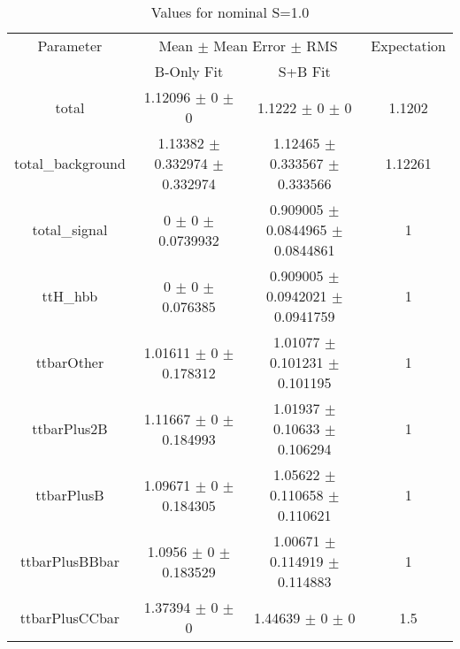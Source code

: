 \begin{table}
\centering
\caption{Values for nominal S=1.0}
\begin{tabular}{cccc}
\toprule
Parameter & \multicolumn{2}{c}{Mean $\pm$ Mean Error $\pm$ RMS} & Expectation\\
 & B-Only Fit & S+B Fit & \\
\midrule
total & \num{1.12096} $\pm$ \num{0} $\pm$ \num{0} & \num{1.1222} $\pm$ \num{0} $\pm$ \num{0} & \num{1.1202}\\
total\_background & \num{1.13382} $\pm$ \num{0.332974} $\pm$ \num{0.332974} & \num{1.12465} $\pm$ \num{0.333567} $\pm$ \num{0.333566} & \num{1.12261}\\
total\_signal & \num{0} $\pm$ \num{0} $\pm$ \num{0.0739932} & \num{0.909005} $\pm$ \num{0.0844965} $\pm$ \num{0.0844861} & \num{1}\\
ttH\_hbb & \num{0} $\pm$ \num{0} $\pm$ \num{0.076385} & \num{0.909005} $\pm$ \num{0.0942021} $\pm$ \num{0.0941759} & \num{1}\\
ttbarOther & \num{1.01611} $\pm$ \num{0} $\pm$ \num{0.178312} & \num{1.01077} $\pm$ \num{0.101231} $\pm$ \num{0.101195} & \num{1}\\
ttbarPlus2B & \num{1.11667} $\pm$ \num{0} $\pm$ \num{0.184993} & \num{1.01937} $\pm$ \num{0.10633} $\pm$ \num{0.106294} & \num{1}\\
ttbarPlusB & \num{1.09671} $\pm$ \num{0} $\pm$ \num{0.184305} & \num{1.05622} $\pm$ \num{0.110658} $\pm$ \num{0.110621} & \num{1}\\
ttbarPlusBBbar & \num{1.0956} $\pm$ \num{0} $\pm$ \num{0.183529} & \num{1.00671} $\pm$ \num{0.114919} $\pm$ \num{0.114883} & \num{1}\\
ttbarPlusCCbar & \num{1.37394} $\pm$ \num{0} $\pm$ \num{0} & \num{1.44639} $\pm$ \num{0} $\pm$ \num{0} & \num{1.5}\\
\bottomrule
\end{tabular}
\end{table}